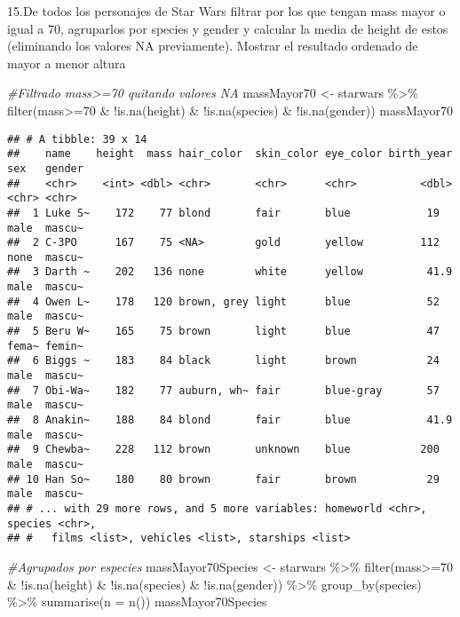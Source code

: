 \documentclass[
]{book}
\newenvironment{Shaded}{\begin{snugshade}}{\end{snugshade}}
\newcommand{\AttributeTok}[1]{\textcolor[rgb]{0.77,0.63,0.00}{#1}}
\newcommand{\CommentTok}[1]{\textcolor[rgb]{0.56,0.35,0.01}{\textit{#1}}}
\newcommand{\DecValTok}[1]{\textcolor[rgb]{0.00,0.00,0.81}{#1}}
\newcommand{\FunctionTok}[1]{\textcolor[rgb]{0.00,0.00,0.00}{#1}}
\newcommand{\NormalTok}[1]{#1}
\newcommand{\OtherTok}[1]{\textcolor[rgb]{0.56,0.35,0.01}{#1}}
\newcommand{\SpecialCharTok}[1]{\textcolor[rgb]{0.00,0.00,0.00}{#1}}
\begin{document}
15.De todos los personajes de Star Wars filtrar por los que tengan mass mayor o igual a 70, agruparlos por species y gender y calcular la media de height de estos (eliminando los valores NA previamente). Mostrar el resultado ordenado de mayor a menor altura

\begin{Shaded}
\begin{Highlighting}[]
\CommentTok{\#Filtrado mass\textgreater{}=70 quitando valores NA}
\NormalTok{massMayor70 }\OtherTok{\textless{}{-}}\NormalTok{ starwars }\SpecialCharTok{\%\textgreater{}\%} \FunctionTok{filter}\NormalTok{(mass}\SpecialCharTok{\textgreater{}=}\DecValTok{70} \SpecialCharTok{\&} \SpecialCharTok{!}\FunctionTok{is.na}\NormalTok{(height) }\SpecialCharTok{\&} \SpecialCharTok{!}\FunctionTok{is.na}\NormalTok{(species) }\SpecialCharTok{\&} \SpecialCharTok{!}\FunctionTok{is.na}\NormalTok{(gender))}
\NormalTok{massMayor70}
\end{Highlighting}
\end{Shaded}

\begin{verbatim}
## # A tibble: 39 x 14
##    name    height  mass hair_color  skin_color eye_color birth_year sex   gender
##    <chr>    <int> <dbl> <chr>       <chr>      <chr>          <dbl> <chr> <chr> 
##  1 Luke S~    172    77 blond       fair       blue            19   male  mascu~
##  2 C-3PO      167    75 <NA>        gold       yellow         112   none  mascu~
##  3 Darth ~    202   136 none        white      yellow          41.9 male  mascu~
##  4 Owen L~    178   120 brown, grey light      blue            52   male  mascu~
##  5 Beru W~    165    75 brown       light      blue            47   fema~ femin~
##  6 Biggs ~    183    84 black       light      brown           24   male  mascu~
##  7 Obi-Wa~    182    77 auburn, wh~ fair       blue-gray       57   male  mascu~
##  8 Anakin~    188    84 blond       fair       blue            41.9 male  mascu~
##  9 Chewba~    228   112 brown       unknown    blue           200   male  mascu~
## 10 Han So~    180    80 brown       fair       brown           29   male  mascu~
## # ... with 29 more rows, and 5 more variables: homeworld <chr>, species <chr>,
## #   films <list>, vehicles <list>, starships <list>
\end{verbatim}

\begin{Shaded}
\begin{Highlighting}[]
\CommentTok{\#Agrupados por especies}
\NormalTok{massMayor70Species }\OtherTok{\textless{}{-}}\NormalTok{ starwars }\SpecialCharTok{\%\textgreater{}\%} \FunctionTok{filter}\NormalTok{(mass}\SpecialCharTok{\textgreater{}=}\DecValTok{70} \SpecialCharTok{\&} \SpecialCharTok{!}\FunctionTok{is.na}\NormalTok{(height) }\SpecialCharTok{\&} \SpecialCharTok{!}\FunctionTok{is.na}\NormalTok{(species) }\SpecialCharTok{\&} \SpecialCharTok{!}\FunctionTok{is.na}\NormalTok{(gender)) }\SpecialCharTok{\%\textgreater{}\%} \FunctionTok{group\_by}\NormalTok{(species) }\SpecialCharTok{\%\textgreater{}\%} \FunctionTok{summarise}\NormalTok{(}\AttributeTok{n =} \FunctionTok{n}\NormalTok{()) }
\NormalTok{massMayor70Species}
\end{Highlighting}
\end{Shaded}
\end{document}
